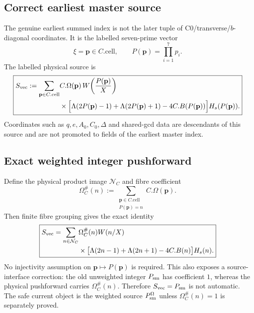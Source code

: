 \subsection{Correct earliest master source}
The genuine earliest summed index is not the later tuple of C0/transverse/$b$-diagonal
coordinates.  It is the labelled seven-prime vector
\[
\boxed{\xi=\mathbf p\in C.\mathrm{cell}},
\qquad
P(\mathbf p)=\prod_{i=1}^{7}p_i.
\]
The labelled physical source is
\[
\boxed{
\begin{aligned}
S_{\rm vec}:=\sum_{\mathbf p\in C.\mathrm{cell}}
 &C.\Omega(\mathbf p)\,W\!\left(\frac{P(\mathbf p)}X\right)\\
 &\times\Bigl[\Lambda(2P(\mathbf p)-1)+\Lambda(2P(\mathbf p)+1)
              -4C.B(P(\mathbf p))\Bigr]H_s(P(\mathbf p)).
\end{aligned}}
\]
Coordinates such as $q,e,A_0,C_0,\Delta$ and shared-gcd data are descendants of this
source and are not promoted to fields of the earliest master index.

\subsection{Exact weighted integer pushforward}
Define the physical product image $\mathcal N_C$ and fibre coefficient
\[
\boxed{
\Omega_C^{\#}(n)
 :=\sum_{\substack{\mathbf p\in C.\mathrm{cell}\\P(\mathbf p)=n}}
 C.\Omega(\mathbf p).}
\]
Then finite fibre grouping gives the exact identity
\[
\boxed{
\begin{aligned}
S_{\rm vec}=\sum_{n\in\mathcal N_C}
 &\Omega_C^{\#}(n)W(n/X)\\
 &\times\bigl[\Lambda(2n-1)+\Lambda(2n+1)-4C.B(n)\bigr]H_s(n).
\end{aligned}}
\]
No injectivity assumption on $\mathbf p\mapsto P(\mathbf p)$ is required.  This also exposes
a source-interface correction: the old unweighted integer $P_{\rm sm}$ has coefficient
$1$, whereas the physical pushforward carries $\Omega_C^{\#}(n)$.  Therefore
$S_{\rm vec}=P_{\rm sm}$ is not automatic.  The safe current object is the weighted source
$P_{\rm sm}^{\Omega}$ unless $\Omega_C^{\#}(n)=1$ is separately proved.

